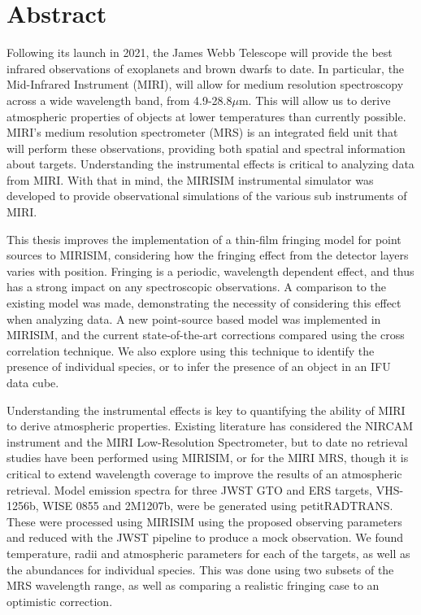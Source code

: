 
\chapter*{Abstract}
Following its launch in 2021, the James Webb Telescope will provide the best infrared observations of exoplanets and brown dwarfs to date.
In particular, the Mid-Infrared Instrument (MIRI), will allow for medium resolution spectroscopy across a wide wavelength band, from 4.9-28.8$\mu$m.
This will allow us to derive atmospheric properties of objects at lower temperatures than currently possible. 
MIRI's medium resolution spectrometer (MRS) is an integrated field unit that will perform these observations, providing both spatial and spectral information about targets.
Understanding the instrumental effects is critical to analyzing data from MIRI.
With that in mind, the MIRISIM instrumental simulator was developed to provide observational simulations of the various sub instruments of MIRI.

This thesis improves the implementation of a thin-film fringing model for point sources to MIRISIM, considering how the fringing effect from the detector layers varies with position. 
Fringing is a periodic, wavelength dependent effect, and thus has a strong impact on any spectroscopic observations.
A comparison to the existing model was made, demonstrating the necessity of considering this effect when analyzing data. 
A new point-source based model was implemented in MIRISIM, and the current state-of-the-art corrections compared using the cross correlation technique.
We also explore using this technique to identify the presence of individual species, or to infer the presence of an object in an IFU data cube.

Understanding the instrumental effects is key to quantifying the ability of MIRI to derive atmospheric properties.
Existing literature has considered the NIRCAM instrument and the MIRI Low-Resolution Spectrometer, but to date no retrieval studies have been performed using MIRISIM, or for the MIRI MRS, though it is critical to extend wavelength coverage to improve the results of an atmospheric retrieval.
Model emission spectra for three JWST GTO and ERS targets, VHS-1256b, WISE 0855 and 2M1207b, were be generated using petitRADTRANS.
These were processed using MIRISIM using the proposed observing parameters and reduced with the JWST pipeline to produce a mock observation.
We found temperature, radii and atmospheric parameters for each of the targets, as well as the abundances for individual species.
This was done using two subsets of the MRS wavelength range, as well as comparing a realistic fringing case to an optimistic correction.
